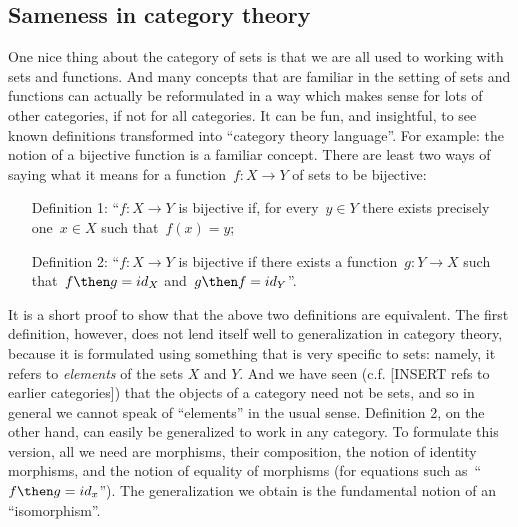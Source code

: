 \subsection{Sameness in category theory}
One nice thing about the category of sets is that we are all used to working with sets and functions. And many concepts that are familiar in the setting of sets and functions can actually be reformulated in a way which makes sense for lots of other categories, if not for all categories. It can be fun, and insightful, to see known definitions transformed into ``category theory language''. For example: the notion of a bijective function is a familiar concept. There are least two ways of saying what it means for a function~$f \colon X \to Y$ of sets to be bijective:
\begin{itemize}
\item[Definition 1:] ``$f\colon X \to Y$ is bijective if, for every~$y \in Y$ there exists precisely one~$x \in X$ such that~$f(x) = y$;
\item[Definition 2:] ``$f\colon X \to Y$ is bijective if there exists a function~$g\colon Y \rightarrow X$ such that~$f \then g = id_X$ and~$g \then f = id_Y$''.
\end{itemize}

It is a short proof to show that the above two definitions are equivalent. The first definition, however, does not lend itself well to generalization in category theory, because it is formulated using something that is very specific to sets: namely, it refers to \emph{elements} of the sets $X$ and $Y$. And we have seen (c.f. [INSERT refs to earlier categories]) that the objects of a category need not be sets, and so in general we cannot speak of ``elements'' in the usual sense. Definition 2, on the other hand, can easily be generalized to work in any category. To formulate this version, all we need are morphisms, their composition, the notion of identity morphisms, and the notion of equality of morphisms (for equations such as~``$f \then g = id_x$''). The generalization we obtain is the fundamental notion of an ``isomorphism''.



